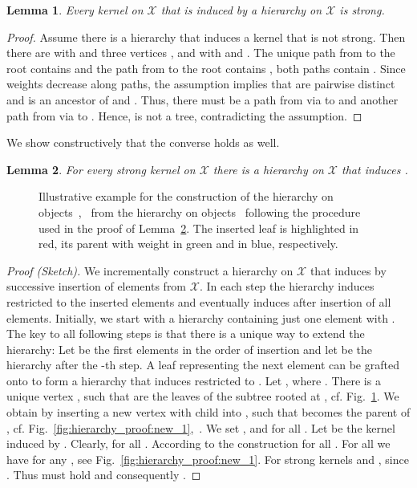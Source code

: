 \documentclass{article}
\newtheorem{lemma}{Lemma}
\newcommand{\X}{\ensuremath{\mathcal{X}}\xspace}
\begin{document}
\begin{lemma}\label{prop:strong_hierarchy:left}
 Every kernel on \X that is induced by a hierarchy on \X is strong.
\end{lemma}
\begin{proof}
Assume there is a hierarchy  that induces a kernel  that is not strong.
Then there are  with  and three 
vertices ,  and  with 
 and . 
The unique path from  to the root contains  and the path from  to the 
root contains , both paths contain .
Since weights decrease along paths, the assumption implies that  are 
pairwise distinct and  is an ancestor of  and . 
Thus, there must be a path from  via  to  and another path from  
via  to .
Hence,  is not a tree, contradicting the assumption.
\end{proof}

We show constructively that the converse holds as well.
\begin{lemma}\label{prop:strong_hierarchy:right}
 For every strong kernel  on \X there is a hierarchy on \X that induces .
\end{lemma}
\begin{figure}
  \centering
  \null\hfill
  \hfill
  \hfill
  \hfill\null
  \caption{Illustrative example for the construction of the hierarchy on  objects~,~ from the hierarchy on  objects~ following the procedure used in the proof of Lemma~\ref{prop:strong_hierarchy:right}. The inserted leaf  is highlighted in
  red, its parent  with weight  in green and  in blue, respectively.}
  \label{fig:hierarchy_proof}
\end{figure}
\begin{proof}[Proof (Sketch)]
 We incrementally construct a hierarchy on \X that induces  by successive insertion
 of elements from \X. In each step the hierarchy induces  restricted to the inserted 
 elements and eventually induces  after insertion of all elements.
 Initially, we start with a hierarchy containing just one element   with
 .
 The key to all following steps is that there is a unique way to extend the 
 hierarchy:
 Let  be the first  elements in the order of insertion and 
 let  be the hierarchy after the -th step. A leaf 
 representing the next element  can be grafted onto  to form a hierarchy 
  that induces  restricted to . 
 Let , where 
 .
 There is a unique vertex , such that  are the leaves of the subtree 
 rooted at , cf. Fig.~\ref{fig:hierarchy_proof}.
 We obtain  by inserting a new vertex  with child  into , such that 
  becomes the parent of , cf. Fig.~\ref{fig:hierarchy_proof:new_1},~.
 We set ,  and  for all .
 Let  be the kernel induced by . Clearly,  for all .
 According to the construction  for all .
 For all  we have  for any 
 , see Fig.~\ref{fig:hierarchy_proof:new_1}.
 For strong kernels  and ,
 since . Thus  must hold and consequently .
\end{proof}
\end{document}
